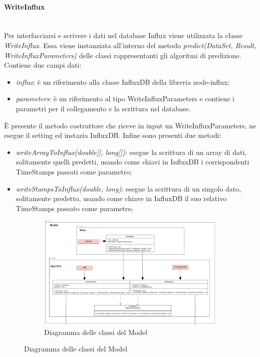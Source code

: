 \paragraph*{WriteInflux} \mbox{}\\ [1mm]
Per interfacciarsi e scrivere i dati nel database Influx viene utilizzata la classe \textit{WriteInflux}. Essa viene instanziata all'interno del metodo \textit{predict(DataSet, Result, WriteInfluxParameters)} delle classi rappresentanti gli algoritmi di predizione. Contiene due campi dati:
\begin{itemize}
	\item \textit{influx}: è un riferimento alla classe InfluxDB della libreria node-influx;
	\item \textit{parameters}: è un riferimento al tipo WriteInfluxParameters e contiene i parametri per il collegamento e la scrittura nel database.
\end{itemize}
È presente il metodo costruttore che riceve in input un WriteInfluxParameters, ne esegue il setting ed instazia InfluxDB.
Infine sono presenti due metodi:
\begin{itemize}
	\item \textit{writeArrayToInflux(double[], long[])}: esegue la scrittura di un array di dati, solitamente quelli predetti, usando come chiavi in InfluxDB i corrispondenti TimeStamps passati come parametro;
	\item \textit{writeStampsToInflux(double, long)}: esegue la scrittura di un singolo dato, solitamente predetto, usando come chiave in InfluxDB il suo relativo TimeStamps passato come parametro.
\end{itemize}
\mbox{}
\begin{landscape}
	\begin{figure}
		\begin{figure} [H]
			\includegraphics[width=\linewidth]{./img/Diagrammi/model-plug-in.png}
			\caption{Diagramma delle classi del Model}
		\end{figure}
	\end{figure}
\end{landscape}


